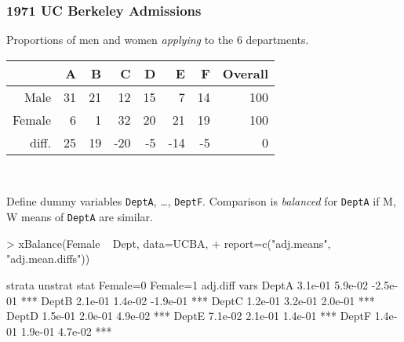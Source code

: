 

\begin{frame}[fragile] 
  \frametitle{1971 UC Berkeley Admissions}

\bigskip

Proportions of men and women \textit{applying} to the 6 departments.\\
\begin{tabular}{rrrrrrrr}
  \hline
 & A & B & C & D & E & F & Overall \\ 
  \hline
Male & 31 & 21 & 12 & 15 & 7 & 14 & 100 \\ 
  Female & 6 & 1 & 32 & 20 & 21 & 19 & 100 \\ 
  diff. & 25 & 19 & -20 & -5 & -14 & -5 & 0 \\ 
   \hline
\end{tabular}\\
\bigskip

Define dummy variables \texttt{DeptA}, \ldots, \texttt{DeptF}. Comparison is \textit{balanced} for \texttt{DeptA} if M, W means of \texttt{DeptA} are similar.

{\small
\begin{Schunk}
\begin{Sinput}
> xBalance(Female ~ Dept, data=UCBA, 
+          report=c("adj.means", "adj.mean.diffs"))
\end{Sinput}
\begin{Soutput}
      strata  unstrat                           
      stat   Female=0 Female=1 adj.diff         
vars                                            
DeptA        3.1e-01  5.9e-02  -2.5e-01 ***     
DeptB        2.1e-01  1.4e-02  -1.9e-01 ***     
DeptC        1.2e-01  3.2e-01  2.0e-01  ***     
DeptD        1.5e-01  2.0e-01  4.9e-02  ***     
DeptE        7.1e-02  2.1e-01  1.4e-01  ***     
DeptF        1.4e-01  1.9e-01  4.7e-02  ***     
\end{Soutput}
\end{Schunk}
}


\end{frame}
